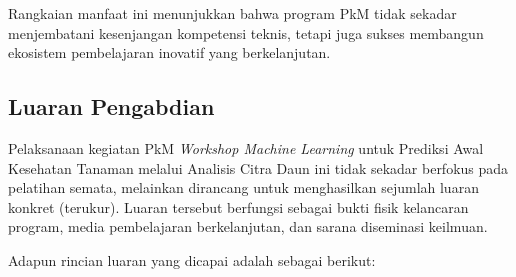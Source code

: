 Rangkaian manfaat ini menunjukkan bahwa program PkM tidak sekadar menjembatani kesenjangan kompetensi teknis, tetapi juga sukses membangun ekosistem pembelajaran inovatif yang berkelanjutan.

\subsection{Luaran Pengabdian}

Pelaksanaan kegiatan PkM \textit{Workshop Machine Learning} untuk Prediksi Awal Kesehatan Tanaman melalui Analisis Citra Daun ini tidak sekadar berfokus pada pelatihan semata, melainkan dirancang untuk menghasilkan sejumlah luaran konkret (terukur). Luaran tersebut berfungsi sebagai bukti fisik kelancaran program, media pembelajaran berkelanjutan, dan sarana diseminasi keilmuan. 

Adapun rincian luaran yang dicapai adalah sebagai berikut:

